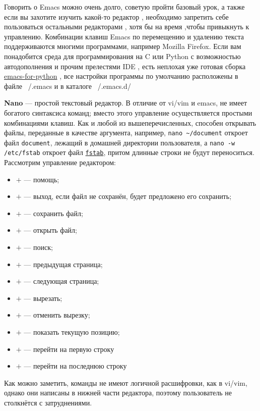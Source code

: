 Говорить о Emacs можно очень долго, советую пройти базовый урок, а также если вы захотите изучить какой-то редактор , необходимо запретить себе пользоваться остальными редакторами , хотя бы на время ,чтобы привыкнуть к управлению. Комбинации клавиш Emacs по перемещению и удалению текста поддерживаются многими программами, например Mozilla Firefox. Если вам понадобится среда для программирования на C  или Python с возможностью автодополнения и прочим прелестями IDE , есть неплохая уже готовая сборка \href{http://gabrielelanaro.github.com/emacs-for-python/}{emacs-for-python} , все настройки программы по умолчанию расположены в файле ~/.emacs и в каталоге ~/.emacs.d/


\textbf{Nano} --- простой текстовый редактор. В отличие от vi/vim и emacs, не имеет богатого синтаксиса команд; вместо этого управление осуществляется простыми комбинациями клавиш. Как и любой из вышеперечисленных, способен открывать файлы, переданные в качестве аргумента, например, \texttt{nano \~{}/document} откроет файл \texttt{document}, лежащий в домашней директории пользователя, а \texttt{nano -w /etc/fstab} откроет файл \hyperref[fstab]{\texttt{fstab}}, притом длинные строки не будут переноситься.
Рассмотрим управление редактором:
\begin{itemize}
 \item \Ctrl$+$ --- помощь;
 \item \Ctrl$+$ --- выход, если файл не сохранён, будет предложено его сохранить;
 \item \Ctrl$+$ --- сохранить файл;
 \item \Ctrl$+$ --- открыть файл;
 \item \Ctrl$+$ --- поиск;
 \item \Ctrl$+$ --- предыдущая страница;
 \item \Ctrl$+$ --- следующая страница;
 \item \Ctrl$+$ --- вырезать;
 \item \Ctrl$+$ --- отменить вырезку;
 \item \Ctrl$+$ --- показать текущую позицию;
 \item \Alt$+$\keystroke{\textbackslash{}} --- перейти на первую строку
 \item \Alt$+$\keystroke{/} --- перейти на последнюю строку
\end{itemize}
Как можно заметить, команды не имеют логичной расшифровки, как в vi/vim, однако они написаны в нижней части редактора, поэтому пользователь не столкнётся с затруднениями.


